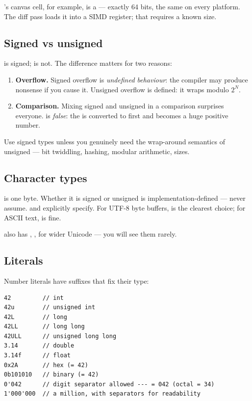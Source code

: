 \maya{}'s canvas cell, for example, is a  ---
exactly 64 bits, the same on every platform. The diff pass loads it
into a SIMD register; that requires a known size.

\subsection{Signed vs unsigned}

 is signed;  is not. The difference
matters for two reasons:

\begin{enumerate}[leftmargin=*]
  \item \textbf{Overflow.} Signed overflow is
    \emph{undefined behaviour}: the compiler may produce nonsense
    if you cause it. Unsigned overflow is defined: it wraps modulo
    $2^N$.
  \item \textbf{Comparison.} Mixing signed and unsigned in a
    comparison surprises everyone.  is
    \emph{false}: the  is converted to 
    first and becomes a huge positive number.
\end{enumerate}

Use signed types unless you genuinely need the wrap-around semantics
of unsigned --- bit twiddling, hashing, modular arithmetic, sizes.

\subsection{Character types}

 is one byte. Whether it is signed or unsigned is
implementation-defined --- never assume.  and
 explicitly specify. For UTF-8 byte buffers,
 is the clearest choice; for ASCII text,
 is fine.

\cpp{} also has , , 
for wider Unicode --- you will see them rarely.

\subsection{Literals}

Number literals have suffixes that fix their type:

\begin{lstlisting}
42         // int
42u        // unsigned int
42L        // long
42LL       // long long
42ULL      // unsigned long long
3.14       // double
3.14f      // float
0x2A       // hex (= 42)
0b101010   // binary (= 42)
0'042      // digit separator allowed --- = 042 (octal = 34)
1'000'000  // a million, with separators for readability
\end{lstlisting}

